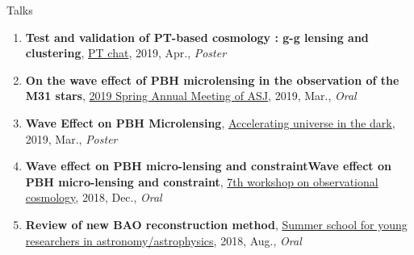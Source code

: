\begin{rSection}{Talks}
\begin{enumerate}[itemsep=0pt, parsep=0pt, topsep=0pt, partopsep=0pt]
\item \textbf{Test and validation of PT-based cosmology : g-g lensing and clustering}, \href{http://pt-chat-kyoto.sciencesconf.org/}{PT chat}, 2019, Apr., \textit{Poster}
\item \textbf{On the wave effect of PBH microlensing in the observation of the M31 stars}, \href{https://www.asj.or.jp/nenkai/archive/2019a/pdf/U14a.pdf}{2019 Spring Annual Meeting of ASJ}, 2019, Mar., \textit{Oral}
\item \textbf{Wave Effect on PBH Microlensing}, \href{http://www2.yukawa.kyoto-u.ac.jp/~aud2019/index.php}{Accelerating universe in the dark}, 2019, Mar., \textit{Poster}
\item \textbf{Wave effect on PBH micro-lensing and constraintWave effect on PBH micro-lensing and constraint}, \href{http://web.cc.yamaguchi-u.ac.jp/~rsaito/obscosmo2018/}{7th workshop on observational cosmology}, 2018, Dec., \textit{Oral}
\item \textbf{Review of new BAO reconstruction method}, \href{http://www.astro-wakate.org/ss2018/web/link.html}{Summer school for young researchers in astronomy/astrophysics}, 2018, Aug., \textit{Oral}
\end{enumerate}\end{rSection}
